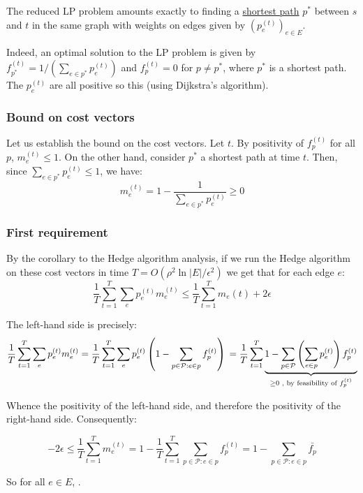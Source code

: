 \documentclass[a4paper, 11pt]{article}
\begin{document}
The reduced LP problem amounts exactly to finding a \underline{shortest path} $p^*$ between $s$ and $t$ in the same graph with weights on edges given by $(p_e^{(t)})_{e\in E}$.

Indeed, an optimal solution to the LP problem is given by $f_{p^*}^{(t)} = 1/(\sum_{e \in p^*}p_e^{(t)})$ and $f_p^{(t)} = 0$ for $p \neq p^*$, where $p^*$ is a shortest path. The $p_e^{(t)}$ are all positive so this  (using Dijkstra's algorithm).

\subsubsection*{Bound on cost vectors}

Let us establish the bound on the cost vectors. Let $t$. By positivity of $f_p^{(t)}$ for all $p$, $m_e^{(t)} \le 1$. On the other hand, consider $p^*$ a shortest path at time $t$. Then, since $\sum_{e \in p^*}p_e^{(t)} \le 1$, we have:
$$m_e^{(t)} = 1 - \frac{1}{\sum_{e \in p^*}p_e^{(t)}} \ge 0$$



\subsubsection*{First requirement}

By the corollary to the Hedge algorithm analysis, if we run the Hedge algorithm on these cost vectors in time $T = O(\rho^2\ln{|E|}/\epsilon^2)$ we get that for each edge $e$:
$$\frac{1}{T}\sum_{t = 1}^{T}\sum_e p_e^{(t)}m_e^{(t)} \leq \frac{1}{T}\sum_{t=1}^{T}m_e{(t)}+2\epsilon$$

The left-hand side is precisely:
$$
\frac{1}{T}\sum_{t = 1}^{T}\sum_e p_e^{(t)}m_e^{(t)}
    = \frac{1}{T}\sum_{t = 1}^{T}\sum_e p_e^{(t)}\left(1 - \sum_{p\in\mathcal{P} : e \in p}f_p^{(t)}\right) \\
    = \frac{1}{T}\sum_{t = 1}^{T}\underbrace{1 - \sum_{p \in \mathcal{P}} \left(\sum_{e \in p} p_e^{(t)}\right)f_p^{(t)}}_{\ge 0\text{ , by feasibility of } f_p^{(t)}}$$

Whence the positivity of the left-hand side, and therefore the positivity of the right-hand side. Consequently:

$$-2\epsilon \le \frac{1}{T}\sum_{t = 1}^{T}m_e^{(t)} = 1 - \frac{1}{T}\sum_{t=1}^{T}\sum_{p \in \mathcal{P} : e \in p}f_p^{(t)} = 1 - \sum_{p \in \mathcal{P}:e \in p}\bar{f_p}$$

So for all $e \in E$, .
\end{document}
